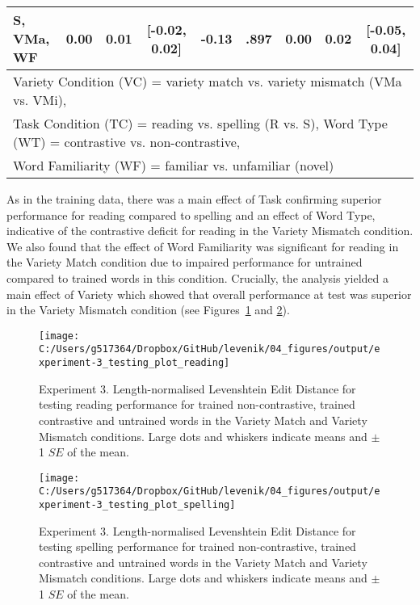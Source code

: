 \documentclass[doc,floatsintext]{apa6}
\begin{document}
\begin{table}[!h]
{\begin{tabular}{lcccccccc}
S, VMa, WF & 0.00 & 0.01 & [-0.02, 0.02] & -0.13 & .897 & 0.00 & 0.02 & [-0.05, 0.04]\\
\bottomrule
\multicolumn{9}{l}{Variety Condition (VC) = variety match vs. variety mismatch (VMa vs. VMi),}\\
\multicolumn{9}{l}{Task Condition (TC) = reading vs. spelling (R vs. S), Word Type (WT) = contrastive vs. non-contrastive,}\\
\multicolumn{9}{l}{Word Familiarity (WF) = familiar vs. unfamiliar (novel)}\\
\end{tabular}}
\end{table}

As in the training data, there was a main effect of Task confirming
superior performance for reading compared to spelling and an effect of
Word Type, indicative of the contrastive deficit for reading in the
Variety Mismatch condition. We also found that the effect of Word
Familiarity was significant for reading in the Variety Match condition
due to impaired performance for untrained compared to trained words in
this condition. Crucially, the analysis yielded a main effect of Variety
which showed that overall performance at test was superior in the
Variety Mismatch condition (see Figures~\ref{fig:ex3-test-reading-plots}
and \ref{fig:ex3-test-spelling-plots}).

\newpage

\begin{figure}[H]

{\centering \texttt{[image: C:/Users/g517364/Dropbox/GitHub/levenik/04\_figures/output/experiment-3\_testing\_plot\_reading]} 

}

\caption{Experiment 3. Length-normalised Levenshtein Edit Distance for testing reading performance for trained non-contrastive, trained contrastive and untrained words in the Variety Match and Variety Mismatch conditions. Large dots and whiskers indicate means and $\pm$ 1 $SE$ of the mean.}\label{fig:ex3-test-reading-plots}
\end{figure}

\begin{figure}[H]

{\centering \texttt{[image: C:/Users/g517364/Dropbox/GitHub/levenik/04\_figures/output/experiment-3\_testing\_plot\_spelling]} 

}

\caption{Experiment 3. Length-normalised Levenshtein Edit Distance for testing spelling performance for trained non-contrastive, trained contrastive and untrained words in the Variety Match and Variety Mismatch conditions. Large dots and whiskers indicate means and $\pm$ 1 $SE$ of the mean.}\label{fig:ex3-test-spelling-plots}
\end{figure}
\end{document}
